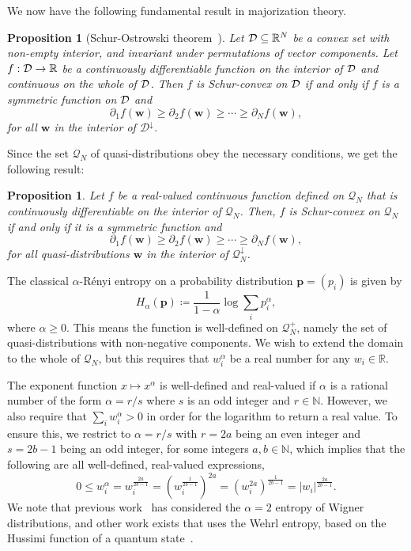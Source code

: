 \documentclass[
twocolumn,
superscriptaddress
]{revtex4-1}
\newtheorem{proposition}[theorem]{Proposition}
\def\w{\boldsymbol{w}}
\def\p{\boldsymbol{p}}
\def\D{{\cal D}}
\begin{document}
We now have the following fundamental result in majorization theory.
\begin{proposition}[Schur-Ostrowski theorem~\cite{Schur_1923, Ostrowski_1952, cit:marshall}] 
	Let $\D\subseteq \mathbb{R}^N$ be a convex set with non-empty interior, and invariant under permutations of vector components. Let $f: \D \rightarrow \mathbb{R}$ be a continuously differentiable function on the interior of $\D$ and continuous on the whole of $\D$. Then $f$ is Schur-convex on $\D$ if and only if $f$ is a symmetric function on $\D$ and 
\begin{equation}
	\partial_1 f(\w) \ge \partial_2 f(\w) \ge \cdots \ge \partial_N f(\w),
\end{equation}
for all $\w$ in the interior of $\mathcal{D}^\downarrow$.
\end{proposition}
Since the set $\mathcal{Q}_N$ of quasi-distributions obey the necessary conditions, we get the following result:
\begin{proposition}
	Let $f$ be a real-valued continuous function defined on $\mathcal{Q}_N$ that is continuously differentiable on the interior of $\mathcal{Q}_N$. 
Then, $f$ is Schur-convex on $\mathcal{Q}_N$ if and only if it is a symmetric function and
\begin{equation}
	\partial_1 f(\w) \ge \partial_2 f(\w) \ge \cdots \ge \partial_N f(\w),
\end{equation}
for all quasi-distributions $\w$ in the interior of $\mathcal{Q}^\downarrow_N$.
\end{proposition}


The classical $\alpha$-R\'{e}nyi entropy on a probability distribution $\p = (p_i)$ is given by
\begin{equation}
	H_\alpha(\p) \coloneqq \frac{1}{1-\alpha} \log \sum_i p_i^\alpha,
\end{equation}
where $\alpha \ge 0$. This means the function is well-defined on $\mathcal{Q}_N^+$, namely the set of quasi-distributions with non-negative components. We wish to extend the domain to the whole of $\mathcal{Q}_N$, but this requires that $w_i^\alpha$ be a real number for any $w_i \in \mathbb{R}$. 

The exponent function $x \mapsto x^\alpha$ is well-defined and real-valued if $\alpha$ is a rational number of the form $\alpha = r / s$ where $s$ is an odd integer and $r \in \mathbb{N}$. However, we also require that $\sum_i w_i^\alpha > 0$ in order for the logarithm to return a real value. To ensure this, we restrict to $\alpha = r/s$ with $r=2a$ being an even integer and $s=2b-1$ being an odd integer, for some integers $a,b\in  \mathbb{N}$, which implies that the following are all well-defined, real-valued expressions,
\begin{equation*}
	0 \le w_i^\alpha = w_i^{\frac{2a}{2b-1}} = \left (w_i^{\frac{1}{2b-1}}\right )^{2a} =\left (w_i^{2a}\right )^{\frac{1}{2b-1}} = |w_i|^{\frac{2a}{2b-1}}.
\end{equation*}
We note that previous work~\cite{Manfredi_2000} has considered the $\alpha=2$ entropy of Wigner distributions, and other work exists that uses the Wehrl entropy, based on the Hussimi function of a quantum state~\cite{Gnutzmann_2001}.
\end{document}
